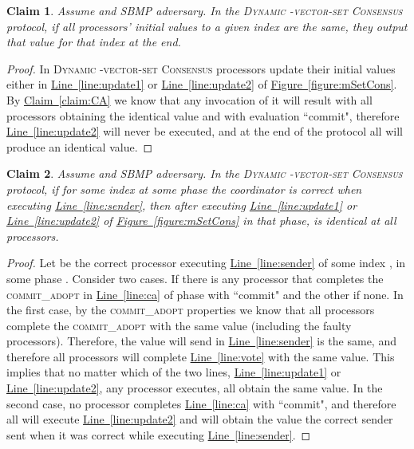 \documentclass[11pt]{article}
\newtheorem{claim}{Claim}
\newcommand{\namedref}[2]{\hyperref[#2]{#1~\ref*{#2}}}
\newcommand{\figureref}[1]{\namedref{Figure}{#1}}
\newcommand{\claimref}[1]{\namedref{Claim}{#1}}
\newcommand{\lref}[1]{\namedref{Line}{#1}}
\newcommand{\SBMPfm}{\mbox{SBMP\!}\xspace}
\newcommand{\mSetCons}{\textsc{Dynamic -vector-set Consensus}\xspace}
\newcommand{\ca}{{\small\textsc{commit\!\_adopt}}\xspace}
\begin{document}
\begin{claim}\label{claim:samev}
Assume  and \SBMPfm adversary.  In the \mSetCons protocol, if all processors' initial values to a given index  are the same, they output that value for that index at the end.
\end{claim}
\begin{proof}
In \mSetCons processors update their initial values either in \lref{line:update1} or \lref{line:update2} of \figureref{figure:mSetCons}.  By \claimref{claim:CA} we know that any invocation of it will result with all processors obtaining the identical value and with evaluation ``commit", therefore \lref{line:update2} will never be executed, and at the end of the protocol all will produce an identical value.
\end{proof}



\begin{claim}\label{claim:correct-coordinator}
Assume  and \SBMPfm adversary.  In the \mSetCons protocol, if  for some index  at some phase the coordinator  is correct when executing \lref{line:sender}, then after executing \lref{line:update1} or \lref{line:update2} of \figureref{figure:mSetCons} in that phase,  is identical at all processors. 
\end{claim}
\begin{proof}
Let  be the correct processor executing \lref{line:sender} of some index , in some phase . Consider two cases.  If there is any processor that completes  the \ca in \lref{line:ca} of phase  with ``commit" and the other if none.  In the first case, by the \ca properties we know that all processors complete the \ca with the same value (including the faulty processors).  Therefore, the value  will send in \lref{line:sender} is the same, and therefore all processors will complete \lref{line:vote} with the same value. This implies that no matter which of the two lines, \lref{line:update1} or \lref{line:update2}, any processor executes, all obtain the same value.
In the second case, no processor completes \lref{line:ca} with ``commit", and therefore all will execute \lref{line:update2} and will obtain the value the correct sender sent when it was correct while executing  \lref{line:sender}.
\end{proof}
\end{document}
